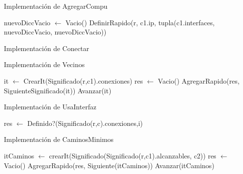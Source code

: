 \begin{Algoritmos}
\begin{algorithm}
\caption{Implementaci\'on de AgregarCompu}
\begin{algorithmic}[0]
	\State nuevoDiccVacio $\gets$ Vacio()  
	\State DefinirRapido(r, c1.ip, tupla(c1.interfaces, nuevoDiccVacio, nuevoDiccVacio)) 
\EndFunction
\end{algorithmic}
\end{algorithm}

\begin{algorithm}
\caption{Implementaci\'on de Conectar}
\begin{algorithmic}[0]

\EndFunction
\end{algorithmic}
\end{algorithm}

\begin{algorithm}
\caption{Implementaci\'on de Vecinos}
\begin{algorithmic}[0]
	\State it $\gets$ CrearIt(Significado(r,c1).conexiones) 
	\State res $\gets$ Vacio()  
	   
		\State AgregarRapido(res, SiguienteSignificado(it)) 
		\State Avanzar(it) 
	\EndWhile
\EndFunction
\end{algorithmic}
\end{algorithm}

\begin{algorithm}
\caption{Implementaci\'on de UsaInterfaz}
\begin{algorithmic}[0]
	\State res $\gets$ Definido?(Significado(r,c).conexiones,i) 
\EndFunction
\end{algorithmic}
\end{algorithm}

\begin{algorithm}
\caption{Implementaci\'on de CaminosMinimos}
\begin{algorithmic}[0]
	\State itCaminos $\gets$ crearIt(Significado(Significado(r,c1).alcanzables, c2)) 
	\State res $\gets$ Vacio()  
		\State AgregarRapido(res, Siguiente(itCaminos)) 
		\State Avanzar(itCaminos) 	
	\EndWhile
\EndFunction
\end{algorithmic}
\end{algorithm}


\end{Algoritmos}
